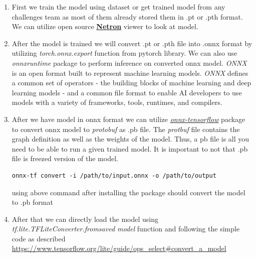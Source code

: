 \begin{enumerate}

\item First we train the model using dataset or get trained model from any challenges team as most of them already stored them in .pt or .pth format. 
\break We can utilize open source \textbf{\href{https://netron.app/}{Netron}} viewer to look at model. 
\item After the model is trained we will convert .pt or .pth file into .onnx format by utilizing \textit{torch.onnx.export} function from pytorch library. We can also use \textit{onnxruntime} package to perform inference on converted onnx model.  
\break
\textit{ONNX} is an open format built to represent machine learning models. \textit{ONNX} defines a common set of operators - the building blocks of machine learning and deep learning models - and a common file format to enable AI developers to use models with a variety of frameworks, tools, runtimes, and compilers. 
\item After we have model in onnx format we can utilize \textit{\href{https://github.com/onnx/onnx-tensorflow}{onnx-tensorflow}} package to convert onnx model to \textit{protobuf} as .pb file. The \textit{protbuf} file contains the graph definition as well as the weights of the model. Thus, a pb file is all you need to be able to run a given trained model. It is important to not that .pb file is freezed version of the model.

\begin{verbatim}
onnx-tf convert -i /path/to/input.onnx -o /path/to/output
\end{verbatim}

using above command after installing the package should convert the model to .pb format
\item After that we can directly load the model using \textit{tf.lite.TFLiteConverter.from\textunderscore saved \textunderscore model} function and following the simple code as described 
\url{https://www.tensorflow.org/lite/guide/ops_select#convert_a_model}
\end{enumerate}


